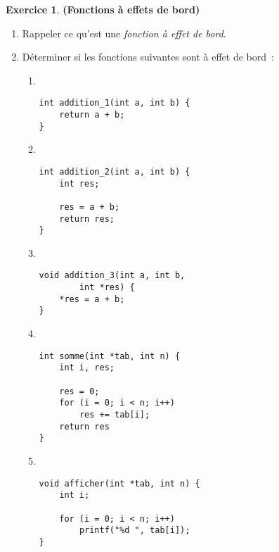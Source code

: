 \documentclass[12pt]{article}
\theoremstyle{definition}
\newtheorem{Exercice}{Exercice}
\begin{document}
\begin{Exercice} {\bf (Fonctions à effets de bord)}\smallskip

\begin{enumerate}
    \item Rappeler ce qu'est une {\em fonction à effet de bord}.
    \smallskip

    \item Déterminer si les fonctions suivantes sont à effet de bord~:
    \begin{multicols}{2}
        \begin{enumerate}
        
            \item ~
\begin{lstlisting}
int addition_1(int a, int b) {
    return a + b;
}
\end{lstlisting}
        \bigskip
        
            \item ~
\begin{lstlisting}
int addition_2(int a, int b) {
    int res;
    
    res = a + b;
    return res;
}
\end{lstlisting}
        \bigskip
        
            \item ~
\begin{lstlisting}
void addition_3(int a, int b, 
        int *res) {
    *res = a + b;
}
\end{lstlisting}
        \bigskip
        
            \item ~
\begin{lstlisting}
int somme(int *tab, int n) {
    int i, res;

    res = 0;
    for (i = 0; i < n; i++)
        res += tab[i];
    return res
}
\end{lstlisting}
            \bigskip

            \item ~
\begin{lstlisting}
void afficher(int *tab, int n) {
    int i;

    for (i = 0; i < n; i++)
        printf("%d ", tab[i]);
}
\end{lstlisting}
            \bigskip
            \bigskip
            \bigskip


\end{enumerate}
\end{multicols}
\end{enumerate}
\end{Exercice}
\end{document}
